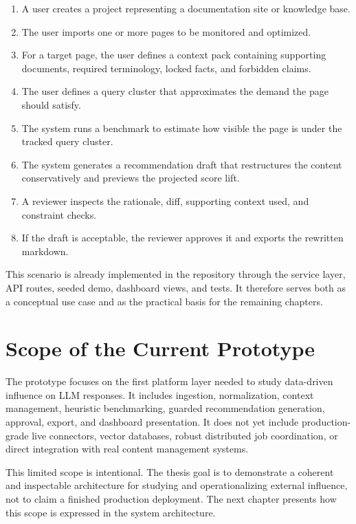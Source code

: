 \begin{enumerate}
    \item A user creates a project representing a documentation site or knowledge base.
    \item The user imports one or more pages to be monitored and optimized.
    \item For a target page, the user defines a context pack containing supporting documents, required terminology, locked facts, and forbidden claims.
    \item The user defines a query cluster that approximates the demand the page should satisfy.
    \item The system runs a benchmark to estimate how visible the page is under the tracked query cluster.
    \item The system generates a recommendation draft that restructures the content conservatively and previews the projected score lift.
    \item A reviewer inspects the rationale, diff, supporting context used, and constraint checks.
    \item If the draft is acceptable, the reviewer approves it and exports the rewritten markdown.
\end{enumerate}

This scenario is already implemented in the repository through the service layer, API routes,
seeded demo, dashboard views, and tests. It therefore serves both as a conceptual use case and
as the practical basis for the remaining chapters.

\section{Scope of the Current Prototype}

The prototype focuses on the first platform layer needed to study data-driven influence on LLM
responses. It includes ingestion, normalization, context management, heuristic benchmarking,
guarded recommendation generation, approval, export, and dashboard presentation. It does not
yet include production-grade live connectors, vector databases, robust distributed job
coordination, or direct integration with real content management systems.

This limited scope is intentional. The thesis goal is to demonstrate a coherent and inspectable
architecture for studying and operationalizing external influence, not to claim a finished
production deployment. The next chapter presents how this scope is expressed in the system
architecture.
